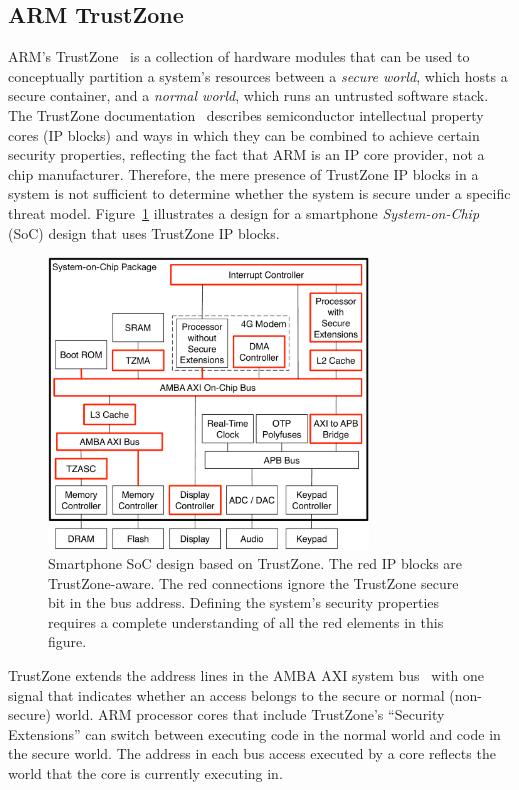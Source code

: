 \subsection{ARM TrustZone}

ARM's TrustZone~\cite{alves2004trustzone} is a collection of hardware modules
that can be used to conceptually partition a system's resources between a
\textit{secure world}, which hosts a secure container, and a \textit{normal
world}, which runs an untrusted software stack. The TrustZone
documentation~\cite{arm2009trustzone} describes semiconductor intellectual
property cores (IP blocks) and ways in which they can be combined to achieve
certain security properties, reflecting the fact that ARM is an IP core
provider, not a chip manufacturer. Therefore, the mere presence of TrustZone IP
blocks in a system is not sufficient to determine whether the system is secure
under a specific threat model. Figure~\ref{fig:trustzone} illustrates a design
for a smartphone \textit{System-on-Chip} (SoC) design that uses TrustZone IP
blocks.

\begin{figure}[hbt]
  \centering
  \includegraphics[width=85mm]{figures/trustzone.pdf}
  \caption{
    Smartphone SoC design based on TrustZone. The red IP blocks are
    TrustZone-aware. The red connections ignore the TrustZone secure bit in the
    bus address. Defining the system's security properties requires a complete
    understanding of all the red elements in this figure.
  }
  \label{fig:trustzone}
\end{figure}

TrustZone extends the address lines in the AMBA AXI system
bus~\cite{arm2004ambaxi} with one signal that indicates whether an access
belongs to the secure or normal (non-secure) world. ARM processor cores that
include TrustZone's ``Security Extensions'' can switch between executing code
in the normal world and code in the secure world. The address in each bus
access executed by a core reflects the world that the core is currently
executing in.

